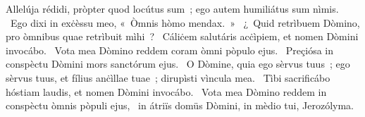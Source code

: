 { Allelúja}
{%
rédidi, pròpter quod locútus sum~; ego autem humiliátus sum nìmis. 
~Ego dixi in exċèssu meo, «~Òmnis hòmo mendax.~»
~¿~Quid retrìbuem Dòmino, pro òmnibus quae retrìbuit mìhi~? 
~Cáliċem salutáris acċìpiem, et nomen Dòmini invocábo. 
~Vota mea Dòmino reddem coram òmni pòpulo ejus. 
~Preçiósa in conspèctu Dòmini mors sanctórum ejus. 
~O Dòmine, quia ego sèrvus tuus~; ego sèrvus tuus, et fílius anċìllae tuae~; dirupìsti vìncula mea. 
~Tìbi sacrificábo hóstiam laudis, et nomen Dòmini invocábo. 
~Vota mea Dòmino reddem in conspèctu òmnis pòpuli ejus, 
~in átriïs domüs Dòmini, in mèdio tui, Jerozólyma. 
}
